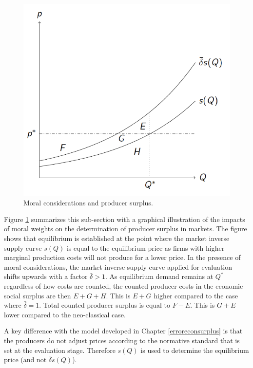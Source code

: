 \documentclass[
]{book}
\begin{document}
\begin{figure}
\includegraphics[width=7.61in]{./figures/psmoral} \caption{Moral considerations and producer surplus.}\label{fig:psmoral}
\end{figure}

Figure \ref{fig:psmoral} summarizes this sub-section with a graphical illustration of the impacts of moral weights on the determination of producer surplus in markets. The figure shows that equilibrium is established at the point where the market inverse supply curve \(s(Q)\) is equal to the equilibrium price as firms with higher marginal production costs will not produce for a lower price. In the presence of moral considerations, the market inverse supply curve applied for evaluation shifts upwards with a factor \(\bar{\delta} > 1\). As equilibrium demand remains at \(Q^*\) regardless of how costs are counted, the counted producer costs in the economic social surplus are then \(E+G+H\). This is \(E+G\) higher compared to the case where \(\bar{\delta}= 1\). Total counted producer surplus is equal to \(F-E\). This is \(G+E\) lower compared to the neo-classical case.

A key difference with the model developed in Chapter \ref{erroreconsurplus} is that the producers do not adjust prices according to the normative standard that is set at the evaluation stage. Therefore \(s(Q)\) is used to determine the equilibrium price (and not \(\bar{\delta}s(Q)\)).
\end{document}
